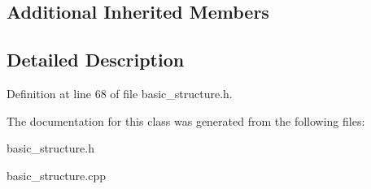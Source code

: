 \subsection*{Additional Inherited Members}


\subsection{Detailed Description}


Definition at line 68 of file basic\+\_\+structure.\+h.



The documentation for this class was generated from the following files\+:\begin{DoxyCompactItemize}
\item 
basic\+\_\+structure.\+h\item 
basic\+\_\+structure.\+cpp\end{DoxyCompactItemize}
